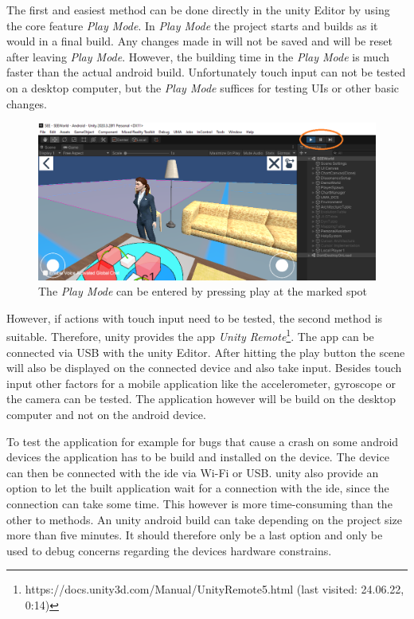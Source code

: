 The first and easiest method can be done directly in the \gls{unity} Editor by using the core feature \textit{Play Mode}.
In \textit{Play Mode} the project starts and builds as it would in a final build.
Any changes made in will not be saved and will be reset after leaving \textit{Play Mode}.
However, the building time in the \textit{Play Mode} is much faster than the actual \gls{android} build.
Unfortunately touch input can not be tested on a desktop computer, but the \textit{Play Mode} suffices for testing UIs or other basic changes. 

\begin{figure}[htb]
    \centering
    \includegraphics[width=1\textwidth]{Fundamentals/img/play_mode.png}
    \caption{The \textit{Play Mode} can be entered by pressing play at the marked spot}
    \label{fig:play_mode}
\end{figure}

However, if actions with touch input need to be tested, the second method is suitable.
Therefore, \gls{unity} provides the app \textit{Unity Remote}\footnote{https://docs.unity3d.com/Manual/UnityRemote5.html (last visited: 24.06.22, 0:14)}.
The app can be connected via USB with the \gls{unity} Editor.
After hitting the play button the \gls{scene} will also be displayed on the connected device and also take input.
Besides touch input other factors for a mobile application like the accelerometer, gyroscope or the camera can be tested. 
The application however will be build on the desktop computer and not on the \gls{android} device. 

To test the application for example for bugs that cause a crash on some \gls{android} devices the application has to be build and installed on the device.
The device can then be connected with the \gls{ide} via Wi-Fi or USB. 
\gls{unity} also provide an option to let the built application wait for a connection with the \gls{ide}, since the connection can take some time.
This however is more time-consuming than the other to methods. 
An \gls{unity} \gls{android} build can take depending on the project size more than five minutes. 
It should therefore only be a last option and only be used to debug concerns regarding the devices hardware constrains. 
